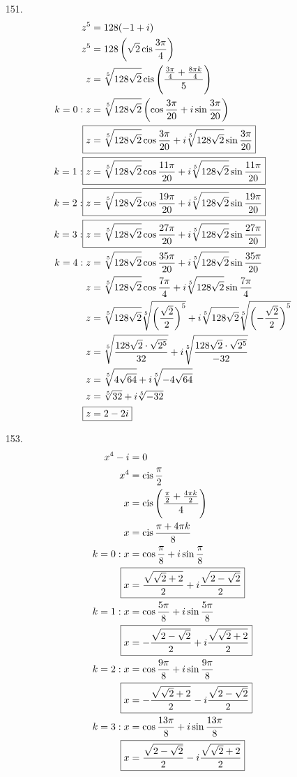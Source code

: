 \documentclass{article}
\DeclareMathOperator{\cis}{cis}
\begin{document}
\begin{itemize}
\item[151.]
	\begin{align*}
		z^5&=128(-1+i) \\
		z^5&=128\left(\sqrt{2}\cis\frac{3\pi}{4}\right) \\
		z&=\sqrt[5]{128\sqrt{2}}\cis\left(\frac{\frac{3\pi}{4}+\frac{8\pi k}{4}}{5}\right) \\
		k=0:z&=\sqrt[5]{128\sqrt{2}}\left(\cos\frac{3\pi}{20}+i\sin\frac{3\pi}{20}\right) \\
		\Aboxed{z&=\sqrt[5]{128\sqrt{2}}\cos\frac{3\pi}{20}+i\sqrt[5]{128\sqrt{2}}\sin\frac{3\pi}{20}} \\
		k=1:\Aboxed{z&=\sqrt[5]{128\sqrt{2}}\cos\frac{11\pi}{20}+i\sqrt[5]{128\sqrt{2}}\sin\frac{11\pi}{20}} \\
		k=2:\Aboxed{z&=\sqrt[5]{128\sqrt{2}}\cos\frac{19\pi}{20}+i\sqrt[5]{128\sqrt{2}}\sin\frac{19\pi}{20}} \\
		k=3:\Aboxed{z&=\sqrt[5]{128\sqrt{2}}\cos\frac{27\pi}{20}+i\sqrt[5]{128\sqrt{2}}\sin\frac{27\pi}{20}} \\
		k=4:z&=\sqrt[5]{128\sqrt{2}}\cos\frac{35\pi}{20}+i\sqrt[5]{128\sqrt{2}}\sin\frac{35\pi}{20} \\
		z&=\sqrt[5]{128\sqrt{2}}\cos\frac{7\pi}{4}+i\sqrt[5]{128\sqrt{2}}\sin\frac{7\pi}{4} \\
		z&=\sqrt[5]{128\sqrt{2}}\sqrt[5]{\left(\frac{\sqrt{2}}{2}\right)^5}+i\sqrt[5]{128\sqrt{2}}\sqrt[5]{\left(-\frac{\sqrt{2}}{2}\right)^5} \\
		z&=\sqrt[5]{\frac{128\sqrt{2}\cdot\sqrt{2^5}}{32}}+i\sqrt[5]{\frac{128\sqrt{2}\cdot\sqrt{2^5}}{-32}} \\
		z&=\sqrt[5]{4\sqrt{64}}+i\sqrt[5]{-4\sqrt{64}} \\
		z&=\sqrt[5]{32}+i\sqrt[5]{-32} \\
		\Aboxed{z&=2-2i}
	\end{align*}

\item[153.]
	\begin{align*}
		x^4-i&=0 \\
		x^4&=\cis\frac{\pi}{2} \\
		x&=\cis\left(\frac{\frac{\pi}{2}+\frac{4\pi k}{2}}{4}\right) \\
		x&=\cis\frac{\pi+4\pi k}{8} \\
		k=0:x&=\cos\frac{\pi}{8}+i\sin\frac{\pi}{8} \\
		\Aboxed{x&=\frac{\sqrt{\sqrt{2}+2}}{2}+i\frac{\sqrt{2-\sqrt{2}}}{2}} \\
		k=1:x&=\cos\frac{5\pi}{8}+i\sin\frac{5\pi}{8} \\
		\Aboxed{x&=-\frac{\sqrt{2-\sqrt{2}}}{2}+i\frac{\sqrt{\sqrt{2}+2}}{2}} \\
		k=2:x&=\cos\frac{9\pi}{8}+i\sin\frac{9\pi}{8} \\
		\Aboxed{x&=-\frac{\sqrt{\sqrt{2}+2}}{2}-i\frac{\sqrt{2-\sqrt{2}}}{2}} \\
		k=3:x&=\cos\frac{13\pi}{8}+i\sin\frac{13\pi}{8} \\
		\Aboxed{x&=\frac{\sqrt{2-\sqrt{2}}}{2}-i\frac{\sqrt{\sqrt{2}+2}}{2}} \\
	\end{align*}


\end{itemize}
\end{document}

